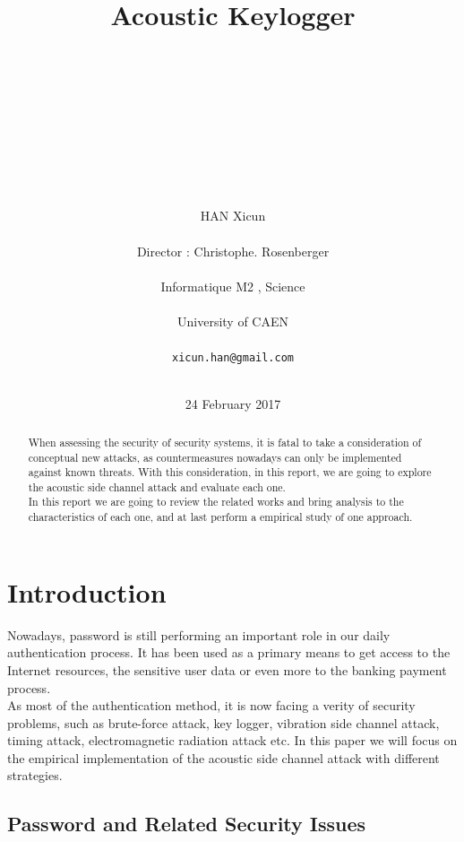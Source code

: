 \documentclass[12pt,a4paper]{article}
\title{Acoustic Keylogger}
\author{\\\\\\\\\\\\\\\\\\HAN Xicun\\\\
Director : Christophe. Rosenberger\\\\
Informatique M2 , Science\\\\
University of CAEN \\\\
\texttt{xicun.han@gmail.com}\\\\}
\date{24 February 2017}
\begin{document}
	\pagestyle{empty}
	\maketitle
	\thispagestyle{empty}
	\clearpage
	
	
	\tableofcontents
	
	\thispagestyle{empty}
	\newpage
	\pagestyle{fancy}
	\lhead{}                    
	\chead{}                                                
	\pagebreak
	\FloatBarrier

\begin{abstract}

When assessing the security of security systems, it is fatal to take a consideration of conceptual new attacks, as countermeasures nowadays can only be implemented against known threats. With this consideration, in this report, we are going to explore the acoustic side channel attack and evaluate each one. \\

In this report we are going to review the related works and bring analysis to the characteristics of each one,  and at last perform a empirical study of one approach.\\


\end{abstract}
\newpage


\section{Introduction}

Nowadays, password is still performing an important role in our daily authentication process. It has been used as a primary means to get access to the Internet resources, the sensitive user data or even more to the banking payment process.  \\

As most of the authentication method, it is now facing a verity of security problems, such as brute-force attack, key logger, vibration side channel attack, timing attack, electromagnetic radiation attack etc. In this paper we will focus on the empirical implementation of the acoustic side channel attack with different strategies.\\

\subsection{Password and Related Security Issues }
\end{document}
